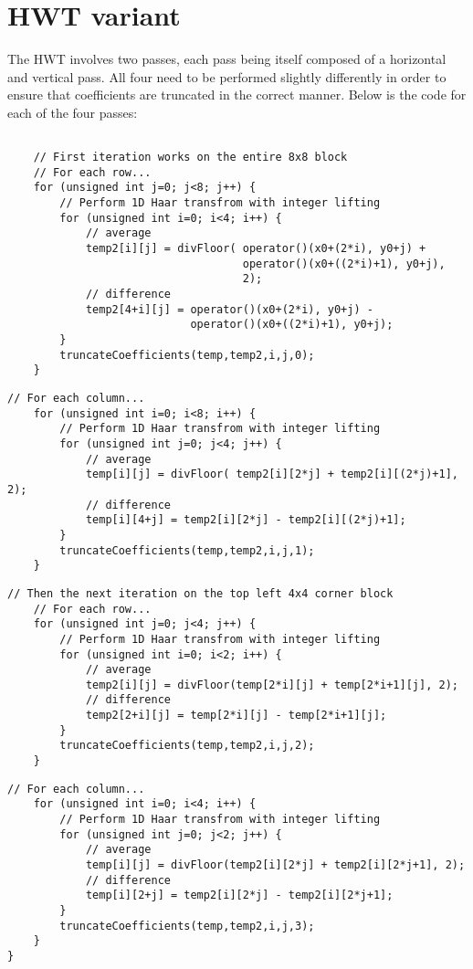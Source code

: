 \chapter{HWT variant}

The HWT involves two passes, each pass being itself composed of a horizontal and vertical pass. All four need to be performed slightly differently in order to ensure that coefficients are truncated in the correct manner. Below is the code for each of the four passes:

\begin{lstlisting}[label=code:pub,caption=Haar Wavelet Transform - first pass]
    
    // First iteration works on the entire 8x8 block
    // For each row...
    for (unsigned int j=0; j<8; j++) {
        // Perform 1D Haar transfrom with integer lifting
        for (unsigned int i=0; i<4; i++) {
            // average
            temp2[i][j] = divFloor( operator()(x0+(2*i), y0+j) +
                                    operator()(x0+((2*i)+1), y0+j),
                                    2);
            // difference
            temp2[4+i][j] = operator()(x0+(2*i), y0+j) -
                            operator()(x0+((2*i)+1), y0+j);
        }
        truncateCoefficients(temp,temp2,i,j,0);
    }
\end{lstlisting}


\begin{lstlisting}[label=code:pub,caption=Haar Wavelet Transform - second pass]
    // For each column...
    for (unsigned int i=0; i<8; i++) {
        // Perform 1D Haar transfrom with integer lifting
        for (unsigned int j=0; j<4; j++) {
            // average
            temp[i][j] = divFloor( temp2[i][2*j] + temp2[i][(2*j)+1], 2);
            // difference
            temp[i][4+j] = temp2[i][2*j] - temp2[i][(2*j)+1];
        }
        truncateCoefficients(temp,temp2,i,j,1);
    }
\end{lstlisting}


\begin{lstlisting}[label=code:pub,caption=Haar Wavelet Transform - third pass]
    // Then the next iteration on the top left 4x4 corner block
    // For each row...
    for (unsigned int j=0; j<4; j++) {
        // Perform 1D Haar transfrom with integer lifting
        for (unsigned int i=0; i<2; i++) {
            // average
            temp2[i][j] = divFloor(temp[2*i][j] + temp[2*i+1][j], 2);
            // difference
            temp2[2+i][j] = temp[2*i][j] - temp[2*i+1][j];
        }
        truncateCoefficients(temp,temp2,i,j,2);
    }
\end{lstlisting}


\begin{lstlisting}[label=code:pub,caption=Haar Wavelet Transform - fourth pass]
    // For each column...
    for (unsigned int i=0; i<4; i++) {
        // Perform 1D Haar transfrom with integer lifting
        for (unsigned int j=0; j<2; j++) {
            // average
            temp[i][j] = divFloor(temp2[i][2*j] + temp2[i][2*j+1], 2);
            // difference
            temp[i][2+j] = temp2[i][2*j] - temp2[i][2*j+1];
        }
        truncateCoefficients(temp,temp2,i,j,3);
    }
}
\end{lstlisting}
